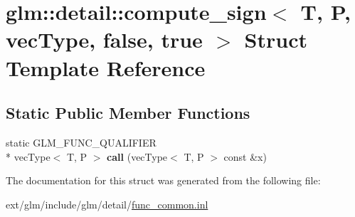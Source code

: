 \hypertarget{structglm_1_1detail_1_1compute__sign_3_01_t_00_01_p_00_01vec_type_00_01false_00_01true_01_4}{\section{glm\-:\-:detail\-:\-:compute\-\_\-sign$<$ T, P, vec\-Type, false, true $>$ Struct Template Reference}
\label{structglm_1_1detail_1_1compute__sign_3_01_t_00_01_p_00_01vec_type_00_01false_00_01true_01_4}
}
\subsection*{Static Public Member Functions}
\begin{DoxyCompactItemize}
\item 
\hypertarget{structglm_1_1detail_1_1compute__sign_3_01_t_00_01_p_00_01vec_type_00_01false_00_01true_01_4_a9b729248aeae16a34e16941d18a50433}{static G\-L\-M\-\_\-\-F\-U\-N\-C\-\_\-\-Q\-U\-A\-L\-I\-F\-I\-E\-R \\*
vec\-Type$<$ T, P $>$ {\bfseries call} (vec\-Type$<$ T, P $>$ const \&x)}\label{structglm_1_1detail_1_1compute__sign_3_01_t_00_01_p_00_01vec_type_00_01false_00_01true_01_4_a9b729248aeae16a34e16941d18a50433}

\end{DoxyCompactItemize}


The documentation for this struct was generated from the following file\-:\begin{DoxyCompactItemize}
\item 
ext/glm/include/glm/detail/\hyperlink{func__common_8inl}{func\-\_\-common.\-inl}\end{DoxyCompactItemize}
